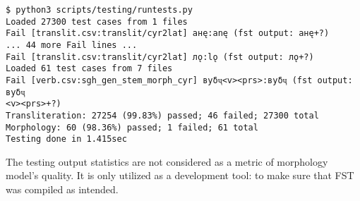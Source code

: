\begin{code_frame}[float,floatplacement=!htbp]
    \begin{footnotesize}\codespacing
    \begin{verbatim}
$ python3 scripts/testing/runtests.py
Loaded 27300 test cases from 1 files
Fail [translit.csv:translit/cyr2lat] анę:anę (fst output: анę+?)
... 44 more Fail lines ...
Fail [translit.csv:translit/cyr2lat] лǫ:lǫ (fst output: лǫ+?)
Loaded 61 test cases from 7 files
Fail [verb.csv:sgh_gen_stem_morph_cyr] вуδҷ<v><prs>:вуδҷ (fst output: вуδҷ
<v><prs>+?)
Transliteration: 27254 (99.83%) passed; 46 failed; 27300 total
Morphology: 60 (98.36%) passed; 1 failed; 61 total
Testing done in 1.415sec
    \end{verbatim}
    \end{footnotesize}
    \tcblower
    \label{code:9_2}
\end{code_frame}

The testing output statistics are not considered as a metric of morphology model's quality. It is only utilized as a development tool: to make sure that FST was compiled as intended.